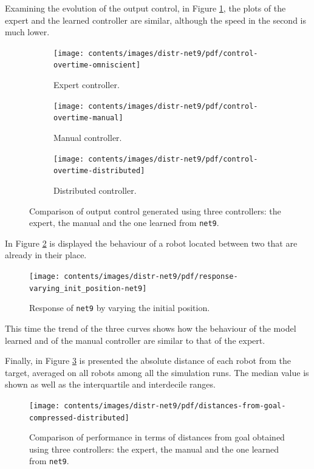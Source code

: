 Examining the evolution of the output control, in Figure \ref{fig:net9control}, 
the plots of the expert and the learned controller are similar, although the speed 
in the second is much lower.
\begin{figure}[!htb]
	\centering
	\begin{subfigure}[h]{0.3\textwidth}
		\centering
		\texttt{[image: contents/images/distr-net9/pdf/control-overtime-omniscient]}%
		\caption{Expert controller.}
	\end{subfigure}
	\hfill
	\begin{subfigure}[h]{0.3\textwidth}
		\centering
		\texttt{[image: contents/images/distr-net9/pdf/control-overtime-manual]}%
		\caption{Manual controller.}
	\end{subfigure}
	\hfill
	\begin{subfigure}[h]{0.3\textwidth}
		\centering
		\texttt{[image: contents/images/distr-net9/pdf/control-overtime-distributed]}
		\caption{Distributed controller.}
	\end{subfigure}
	\caption[Evaluation of the control learned by \texttt{net9}.]{Comparison 
		of output control generated using three controllers: the expert, the manual 
		and the one learned from \texttt{net9}.}
	\label{fig:net9control}
\end{figure}

In Figure \ref{fig:net9responseposition} is displayed the behaviour of a robot 
located between two that are already in their place.
\begin{figure}[!htb]
	\centering
	\texttt{[image: contents/images/distr-net9/pdf/response-varying\_init\_position-net9]}%
	\caption{Response of \texttt{net9} by varying the initial position.}
	\label{fig:net9responseposition}
\end{figure}
This time the trend of the three curves shows how the behaviour of the model 
learned and of the manual controller are similar to that of the expert.

Finally, in Figure \ref{fig:net9distance} is presented the absolute distance of each 
robot from the target, averaged on all robots among all the simulation runs. The 
median value is shown as well as the interquartile and interdecile ranges.
\begin{figure}[!htb]
	\centering
	\texttt{[image: contents/images/distr-net9/pdf/distances-from-goal-compressed-distributed]}%
	\caption[Evaluation of \texttt{net9} distances from goal.]{Comparison of 
		performance in terms of distances from goal obtained using three 
		controllers: the expert, the manual and the one learned from \texttt{net9}.}
	\label{fig:net9distance}
\end{figure}

